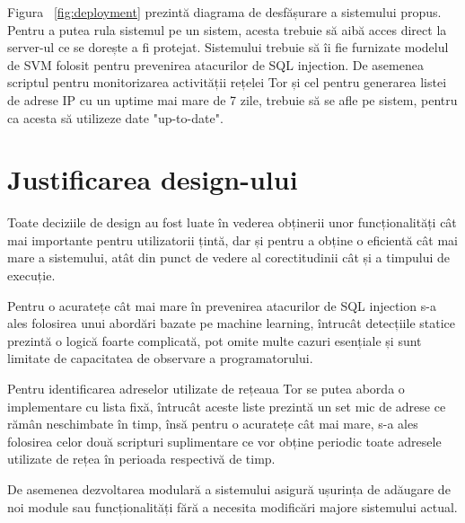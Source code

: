 Figura ~\ref{fig:deployment}  prezintă diagrama de desfășurare a sistemului propus.  \\
Pentru a putea rula sistemul \textit{\thesistitle}  pe un sistem, acesta trebuie să aibă acces direct la server-ul ce se dorește a fi protejat. Sistemului trebuie să îi fie furnizate modelul de SVM folosit pentru prevenirea atacurilor de SQL injection. De asemenea scriptul pentru monitorizarea activității rețelei Tor și cel pentru generarea listei de adrese IP cu un uptime mai mare de 7 zile, trebuie să se afle pe sistem, pentru ca acesta să utilizeze date "up-to-date". 

\section{Justificarea design-ului}
 

 Toate deciziile de design au fost luate în vederea obținerii unor funcționalități cât mai importante pentru utilizatorii țintă, dar și pentru a obține o eficientă cât mai mare a sistemului, atât din punct de vedere al corectitudinii cât și a timpului de execuție. 


Pentru o acuratețe cât mai mare în prevenirea atacurilor de SQL injection s-a ales folosirea unui abordări bazate pe machine learning, întrucât detecțiile statice prezintă o logică foarte complicată, pot omite multe cazuri esențiale și sunt limitate de capacitatea de observare a programatorului.  


Pentru identificarea adreselor utilizate de rețeaua Tor se putea aborda o implementare cu lista fixă, întrucât aceste liste prezintă un set mic de adrese ce rămân neschimbate în timp, însă pentru o acuratețe cât mai mare, s-a ales folosirea celor două scripturi suplimentare ce vor obține periodic toate adresele utilizate de rețea în perioada respectivă de timp. 


De asemenea dezvoltarea modulară a sistemului asigură ușurința de adăugare de noi module sau funcționalități fără a necesita modificări majore sistemului actual. 

